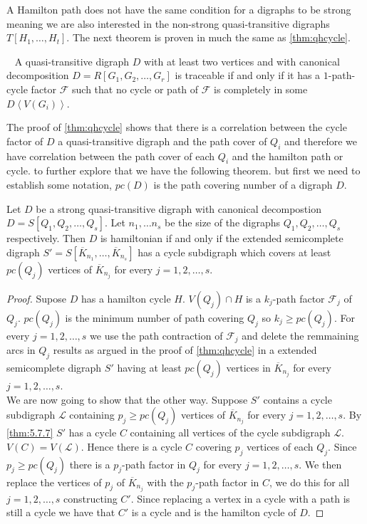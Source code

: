 A Hamilton path does not have the same condition for a digraphs to be strong meaning we are also interested in the non-strong quasi-transitive digraphs $T[H_1,\dots ,H_t]$. 
The next theorem is proven in much the same as \autoref{thm:qhcycle}. 
\begin{thm}~\cite{bangJGT20}
    A quasi-transitive digraph $D$ with at least two vertices and with canonical decomposition $D=R[G_1,G_2,\dots , G_r]$ is traceable if and only if it has a $1$-path-cycle factor $\mathcal{F}$ such that no cycle or path of $\mathcal{F}$ is completely in some $D\left< V(G_i)\right>$.
\end{thm}
The proof of \autoref{thm:qhcycle} shows that there is a correlation between the cycle factor of $D$ a quasi-transitive digraph and the path cover of $Q_i$ and therefore we have correlation between the path cover of each $Q_i$ and the hamilton path or cycle. to further explore that we have the following theorem.
but first we need to establish some notation, $pc(D)$ is the path covering number of a digraph $D$. 
\begin{thm}
    Let $D$ be a strong quasi-transitive digraph with canonical decompostion $D=S[Q_1,Q_2,\dots,Q_s]$.
    Let $n_1,\dots n_s$ be the size of the digraphs $Q_1,Q_2,\dots ,Q_s$ respectively. 
    Then $D$ is hamiltonian if and only if the extended semicomplete digraph $S'=S[\overline{K}_{n_1},\dots ,\overline{K}_{n_s}]$ has a cycle subdigraph which covers at least $pc(Q_j)$ vertices of $\overline{K}_{n_j}$ for every $j=1,2,\dots , s$.
\end{thm}
\begin{proof}
    Supose $D$ has a hamilton cycle $H$.
    $V(Q_j)\cap H$ is a $k_j$-path factor $\mathcal{F}_j$ of $Q_j$. 
    $pc(Q_j)$ is the minimum number of path covering $Q_j$ so $k_j\geq pc(Q_j)$. 
    For every $j=1,2,\dots ,s$ we use the path contraction of $\mathcal{F}_j$ and delete the remmaining arcs in $Q_j$ results as argued in the proof of \autoref{thm:qhcycle} in a extended semicomplete digraph $S'$ having at least $pc(Q_j)$ vertices in $\overline{K}_{n_j}$ for every $j=1,2,\dots ,s$.\\
    We are now going to show that the other way.
    Suppose $S'$ contains a cycle subdigraph $\mathcal{L}$ containing $p_j\geq pc(Q_j)$ vertices of $\overline{K}_{n_j}$ for every $j=1,2,\dots ,s$.
    By \autoref{thm:5.7.7} $S'$ has a cycle $C$ containing all vertices of the cycle subdigraph $\mathcal{L}$. $V(C)=V(\mathcal{L})$. 
    Hence there is a cycle $C$ covering $p_j$ vertices of each $Q_j$. Since $p_j\geq pc(Q_j)$ there is a $p_j$-path factor in $Q_j$ for every $j=1,2,\dots ,s$.
    We then replace the vertices of $p_j$ of $\overline{K}_{n_j}$ with the $p_j$-path factor in $C$, we do this for all $j=1,2,\dots ,s$ constructing $C'$. Since replacing a vertex in a cycle with a path is still a cycle we have that $C'$ is a cycle and is the hamilton cycle of $D$. 
\end{proof}

